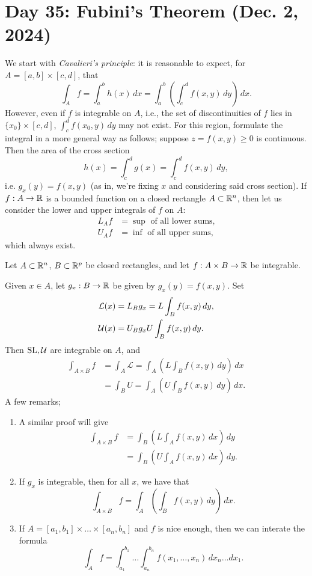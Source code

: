 \section{Day 35: Fubini's Theorem (Dec. 2, 2024)}
We start with \textit{Cavalieri's principle}: it is reasonable to expect, for $A = [a, b] \times [c, d]$, that
\[ \int_A f = \int_a^b h(x) \, dx = \int_a^b \left(\int_c^d f(x, y) \, dy\right) \, dx. \] 
However, even if $f$ is integrable on $A$, i.e., the set of discontinuities of $f$ lies in $\{x_0\} \times [c, d]$, $\int_c^d f(x_0, y) \, dy$ may not exist. For this region, formulate the integral in a more general way as follows; suppose $z = f(x, y) \geq 0$ is continuous. Then the area of the cross section
\[ h(x) = \int_c^d g(x) = \int_c^d f(x, y) \, dy, \]
i.e. $g_x(y) = f(x, y)$ (as in, we're fixing $x$ and considering said cross section). If $f : A \to \mathbb R$ is a bounded function on a closed rectangle $A \subset \mathbb R^n$, then let us consider the lower and upper integrals of $f$ on $A$:
\begin{align*}
    L_A f &= \sup \text{ of all lower sums,} \\
    U_A f &= \inf \text{ of all upper sums,}
\end{align*}
which always exist.
\begin{simplethm}
    Let $A \subset \mathbb R^n$, $B \subset \mathbb R^p$ be closed rectangles, and let $f : A \times B \to \mathbb R$ be integrable.
\end{simplethm}
\noindent Given $x \in A$, let $g_x : B \to \mathbb R$ be given by $g_x(y) = f(x, y)$. Set
\begin{align*}
    \mathcal{L}(x) &= L_B g_x = L \int_B f(x, y) \, dy, \\
    \mathcal U(x) &= U_B g_x U \int_B f(x, y) \, dy.
\end{align*}
Then $\operatorname{SL}, \mathcal U$ are integrable on $A$, and
\begin{align*}
    \int_{A \times B} f &= \int_A \mathcal{L} = \int_A \left( L \int_B f(x, y) \, dy \right) \, dx \\
    &= \int_B U = \int_A \left( U \int_B f(x, y) \, dy \right) \, dx.
\end{align*}
A few remarks;
\begin{enumerate}[label=(\roman*)]
    \item A similar proof will give
    \begin{align*}
        \int_{A \times B} f &= \int_B \left( L \int_A f(x, y) \, dx \right) \, dy \\
        &= \int_B \left( U \int_A f(x, y) \, dx \right) \, dy.
    \end{align*}
    \item If $g_x$ is integrable, then for all $x$, we have that
    \[ \int_{A \times B} f = \int_A \left( \int_B f(x, y) \, dy \right) \, dx. \]
    \item If $A = [a_1, b_1] \times \dots \times [a_n, b_n]$ and $f$ is nice enough, then we can interate the formula
    \[ \int_A f = \int_{a_1}^{b_1} \dots \int_{a_n}^{b_n} f(x_1, \dots, x_n) \, dx_n \dots dx_1. \]
\end{enumerate}
